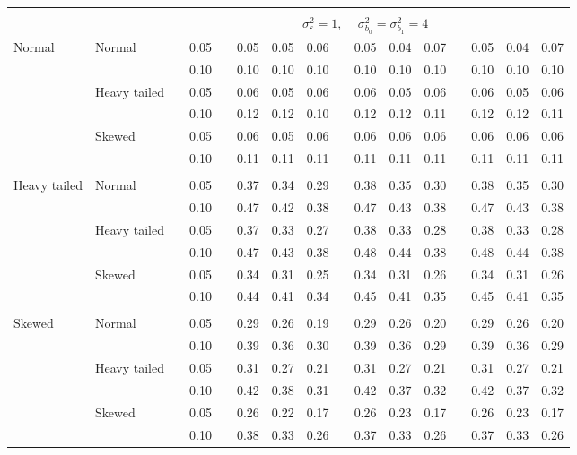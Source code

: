 \documentclass{article} %
\begin{document}
\begin{table}[ht]
\begin{scriptsize}
\begin{center}
\begin{tabular}{ll p{.1cm} c p{.1cm} rrr p{.1cm} rrr p{.1cm} rrr}
&&&&&&&&&&&&&&&\\
& && && \multicolumn{9}{c}{$\sigma_{\varepsilon}^2 = 1$, \ \ $\sigma_{b_0}^2 = \sigma_{b_1}^2 = 4$} \\ \cline{6-16}
\rowcolor{gray!20}Normal       & Normal       && 0.05 &&   0.05 & 0.05 & 0.06 && 0.05 & 0.04 & 0.07 && 0.05 & 0.04 & 0.07 \\ 
\rowcolor{gray!20}             &              && 0.10 &&   0.10 & 0.10 & 0.10 && 0.10 & 0.10 & 0.10 && 0.10 & 0.10 & 0.10 \\ 
\rowcolor{gray!20}             & Heavy tailed && 0.05 &&   0.06 & 0.05 & 0.06 && 0.06 & 0.05 & 0.06 && 0.06 & 0.05 & 0.06 \\ 
\rowcolor{gray!20}             &              && 0.10 &&   0.12 & 0.12 & 0.10 && 0.12 & 0.12 & 0.11 && 0.12 & 0.12 & 0.11 \\ 
\rowcolor{gray!20}             & Skewed       && 0.05 &&   0.06 & 0.05 & 0.06 && 0.06 & 0.06 & 0.06 && 0.06 & 0.06 & 0.06 \\ 
\rowcolor{gray!20}             &              && 0.10 &&   0.11 & 0.11 & 0.11 && 0.11 & 0.11 & 0.11 && 0.11 & 0.11 & 0.11 \\ 
             &&&&&&&&&&&&&&&\\
Heavy tailed & Normal       && 0.05 &&   0.37 & 0.34 & 0.29 && 0.38 & 0.35 & 0.30 && 0.38 & 0.35 & 0.30 \\ 
             &              && 0.10 &&   0.47 & 0.42 & 0.38 && 0.47 & 0.43 & 0.38 && 0.47 & 0.43 & 0.38 \\ 
             & Heavy tailed && 0.05 &&   0.37 & 0.33 & 0.27 && 0.38 & 0.33 & 0.28 && 0.38 & 0.33 & 0.28 \\ 
             &              && 0.10 &&   0.47 & 0.43 & 0.38 && 0.48 & 0.44 & 0.38 && 0.48 & 0.44 & 0.38 \\ 
             & Skewed       && 0.05 &&   0.34 & 0.31 & 0.25 && 0.34 & 0.31 & 0.26 && 0.34 & 0.31 & 0.26 \\ 
             &              && 0.10 &&   0.44 & 0.41 & 0.34 && 0.45 & 0.41 & 0.35 && 0.45 & 0.41 & 0.35 \\ 
             &&&&&&&&&&&&&&&\\
Skewed       & Normal       && 0.05 &&   0.29 & 0.26 & 0.19 && 0.29 & 0.26 & 0.20 && 0.29 & 0.26 & 0.20 \\ 
             &              && 0.10 &&   0.39 & 0.36 & 0.30 && 0.39 & 0.36 & 0.29 && 0.39 & 0.36 & 0.29 \\ 
             & Heavy tailed && 0.05 &&   0.31 & 0.27 & 0.21 && 0.31 & 0.27 & 0.21 && 0.31 & 0.27 & 0.21 \\ 
             &              && 0.10 &&   0.42 & 0.38 & 0.31 && 0.42 & 0.37 & 0.32 && 0.42 & 0.37 & 0.32 \\ 
             & Skewed       && 0.05 &&   0.26 & 0.22 & 0.17 && 0.26 & 0.23 & 0.17 && 0.26 & 0.23 & 0.17 \\ 
             &              && 0.10 &&   0.38 & 0.33 & 0.26 && 0.37 & 0.33 & 0.26 && 0.37 & 0.33 & 0.26 \\ 



\end{tabular}
\end{center}
\end{scriptsize}
\end{table}
\end{document}
